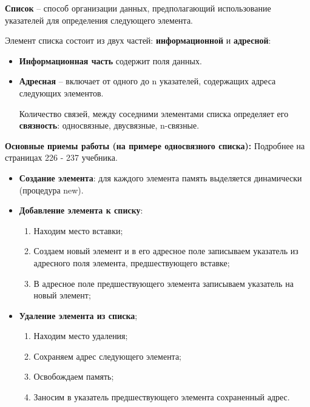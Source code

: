 {\bf Список} – способ организации данных, предполагающий использование указателей для определения следующего элемента.

Элемент списка состоит из двух частей: {\bf информационной} и {\bf адресной}:
\begin{itemize}
\item {\bf Информационная часть} содержит поля данных.

\item {\bf Адресная} – включает от одного до n указателей, содержащих адреса следующих элементов. 

Количество связей, между соседними элементами списка определяет его {\bf связность}: односвязные, двусвязные, n-связные.
\end{itemize}

{\bf Основные приемы работы (на примере односвязного списка):}
{ {Подробнее на страницах 226 - 237 учебника.}}
\begin{itemize}
    \item {\bf Создание элемента}: для каждого элемента память выделяется динамически (процедура new).
    
    \item {\bf Добавление элемента к списку}:
    \begin{enumerate}
    \item Находим место вставки;

    \item Создаем новый элемент и в его адресное поле записываем указатель из адресного поля элемента, предшествующего вставке;

    \item В адресное поле предшествующего элемента записываем указатель на новый элемент;
    \end{enumerate}
    \item {\bf Удаление элемента из списка};
    \begin{enumerate}
        \item Находим место удаления;
        \item Сохраняем адрес следующего элемента;
        \item Освобождаем память;
        \item Заносим в указатель предшествующего элемента сохраненный адрес. 
    \end{enumerate}

\end{itemize}




